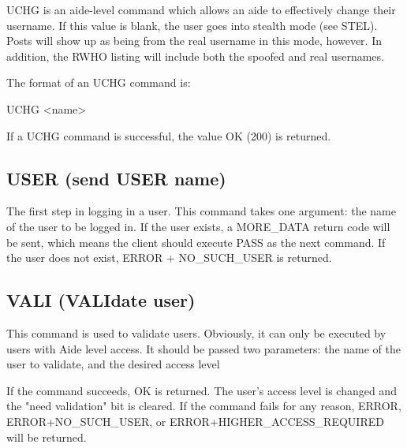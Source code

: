  UCHG is an aide-level command which allows an aide to effectively change their
username.  If this value is blank, the user goes into stealth mode (see
STEL).  Posts
will show up as being from the real username in this mode, however.  In
addition, the RWHO listing will include both the spoofed and real usernames.

 The format of an UCHG command is:

 UCHG <name>

 If a UCHG command is successful, the value OK (200) is returned.



\subsection{USER (send USER name)}

 The first step in logging in a user.  This command takes one argument: the
name of the user to be logged in.  If the user exists, a MORE_DATA return
code will be sent, which means the client should execute PASS as the next
command.  If the user does not exist, ERROR + NO_SUCH_USER is returned.



\subsection{VALI (VALIdate user)}

 This command is used to validate users.  Obviously, it can only be executed
by users with Aide level access.  It should be passed two parameters: the
name of the user to validate, and the desired access level

 If the command succeeds, OK is returned.  The user's access level is changed
and the "need validation" bit is cleared.  If the command fails for any
reason, ERROR, ERROR+NO_SUCH_USER, or ERROR+HIGHER_ACCESS_REQUIRED will be
returned.


